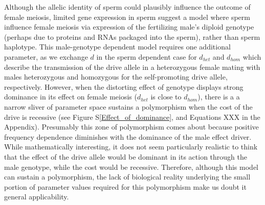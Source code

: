\documentclass[12pt,letterpaper]{article}
\newcommand{\gc}[1]{{ \color{red} #1}}
\newcommand{\yb}[1]{{ \color{blue} #1}}
\begin{document}
Although the allelic identity of sperm could plausibly influence the outcome of female meiosis, 
	limited gene expression in sperm \citep[e.g.][]{Joseph2004}
	suggest a model where sperm influence female meiosis via expression of the fertilizing male's
	diploid genotype (perhaps due to proteins and RNAs packaged into the sperm), rather than sperm haplotype.
This male-genotype dependent model requires one additional parameter, as we exchange $d$ in the sperm dependent case for $d_{het}$ and $d_{hom}$ which describe the transmission of the drive allele in a heterozygous female mating with males heterozygous and homozygous for the self-promoting drive allele, respectively.  
However, when
the distorting effect of genotype displays strong dominance in its
effect on female meiosis ($d_{het}$ is close to $d_{hom}$), 
there is a a narrow sliver of parameter space sustains a polymorphism
when the cost of the drive is recessive
(see Figure S\ref{Effect_of_dominance}, \yb{and Equations XXX in the Appendix}).  
Presumably this zone of polymorphism comes about because positive frequency dependence diminishes with the dominance of the male effect driver. 
While mathematically interesting, it does not seem particularly realistic to think that the
effect of the drive allele would be dominant in its action through the
male genotype, while the cost would be recessive. 
Therefore, although this model can sustain a polymorphism, the lack of biological reality underlying the small portion of parameter values required for this polymorphism make us doubt it general applicability. 

\end{document}
